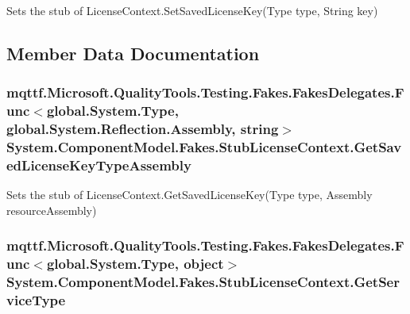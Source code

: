 Sets the stub of License\-Context.\-Set\-Saved\-License\-Key(\-Type type, String key)



\subsection{Member Data Documentation}
\hypertarget{class_system_1_1_component_model_1_1_fakes_1_1_stub_license_context_a2d47a082036346eca2be8fdd2164ddb3}{
\subsubsection[{Get\-Saved\-License\-Key\-Type\-Assembly}]{\setlength{\rightskip}{0pt plus 5cm}mqttf.\-Microsoft.\-Quality\-Tools.\-Testing.\-Fakes.\-Fakes\-Delegates.\-Func$<$global.\-System.\-Type, global.\-System.\-Reflection.\-Assembly, string$>$ System.\-Component\-Model.\-Fakes.\-Stub\-License\-Context.\-Get\-Saved\-License\-Key\-Type\-Assembly}}\label{class_system_1_1_component_model_1_1_fakes_1_1_stub_license_context_a2d47a082036346eca2be8fdd2164ddb3}


Sets the stub of License\-Context.\-Get\-Saved\-License\-Key(\-Type type, Assembly resource\-Assembly)

\hypertarget{class_system_1_1_component_model_1_1_fakes_1_1_stub_license_context_a377208b5b5965ccb9eee88446771ba89}{
\subsubsection[{Get\-Service\-Type}]{\setlength{\rightskip}{0pt plus 5cm}mqttf.\-Microsoft.\-Quality\-Tools.\-Testing.\-Fakes.\-Fakes\-Delegates.\-Func$<$global.\-System.\-Type, object$>$ System.\-Component\-Model.\-Fakes.\-Stub\-License\-Context.\-Get\-Service\-Type}}\label{class_system_1_1_component_model_1_1_fakes_1_1_stub_license_context_a377208b5b5965ccb9eee88446771ba89}


